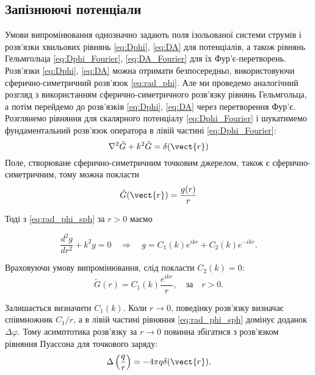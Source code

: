 \subsection*{Запізнюючі потенціали}


Умови випромінювання однозначно задають поля ізольованої системи струмів і розв’язки хвильових рівнянь \eqref{eq:Dphi}, \eqref{eq:DA} для потенціалів, а
також рівнянь
Гельмгольца \eqref{eq:Dphi_Fourier}, \eqref{eq:DA_Fourier} для їх Фур’є-перетворень. Розв’язки \eqref{eq:Dphi}, \eqref{eq:DA} можна отримати
безпосередньо,
використовуючи сферично-симетричний
розв’язок \eqref{eq:rad_phi}. Але ми проведемо аналогічний розгляд з використанням сферично-симетричного розв’язку рівнянь Гельмгольца, а потім
перейдемо до
розв’язків \eqref{eq:Dphi}, \eqref{eq:DA} через перетворення Фур’є. Розглянемо рівняння для скалярного потенціалу \eqref{eq:Dphi_Fourier} і шукатимемо
фундаментальний
розв’язок
оператора в лівій частині \eqref{eq:Dphi_Fourier}:
\begin{equation}
	\nabla^2\tilde{G} + k^2\tilde{G} = \delta(\vect{r})
\end{equation}
Поле, створюване сферично-симетричним точковим джерелом, також є сферично-симетричним, тому можна покласти
\begin{equation}
	\tilde{G} (\vect{r}) = \frac{g(r)}{r}
\end{equation}

Тоді з \eqref{eq:rad_phi_sph} за $r>0$ маємо

\begin{equation}
	\frac{d^2 g}{dr^2} + k^2 g = 0 \quad \Rightarrow \quad g = C_1(k) e^{ikr} + C_2(k) e^{-ikr}.
\end{equation}

Враховуючи умову випромінювання, слід покласти $C_2(k)=0$:
\begin{equation}
	\tilde{G}(r) = C_1(k) \frac{e^{ikr}}{r}, \quad \text{за} \quad r>0.
\end{equation}

Залишається визначити $C_1(k)$. Коли $r \to 0$, поведінку розв’язку визначає співмножник $C_1/r$, а в лівій частині рівняння \eqref{eq:rad_phi_sph}
домінує доданок
$\Delta \varphi$. Тому асимптотика розв’язку за $r \to 0$ повинна збігатися з розв’язком рівняння Пуассона для точкового заряду:
\begin{equation}
	\Delta \left( \frac{q}{r} \right) = -4\pi q \delta (\vect{r}).
\end{equation}

